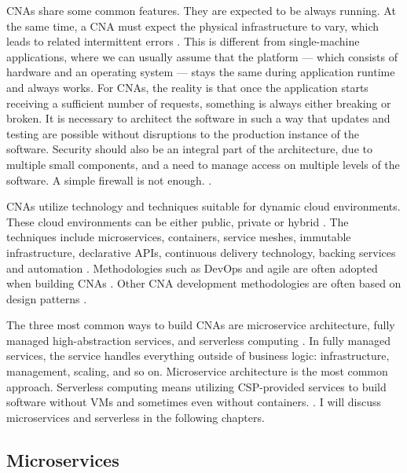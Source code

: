 \documentclass[utf8,english]{gradu3}
\begin{document}
CNAs share some common features. They are expected to be always running. At the
same time, a CNA must expect the physical infrastructure to vary, which leads to
related intermittent errors \parencite[17]{Gannon2017}. This is different from
single-machine applications, where we can usually assume that the platform —
which consists of hardware and an operating system --- stays the same during
application runtime and always works. For CNAs, the reality is that once the
application starts receiving a sufficient number of requests, something is
always either breaking or broken. It is necessary to architect the software in
such a way that updates and testing are possible without disruptions to the
production instance of the software. Security should also be an integral part of
the architecture, due to multiple small components, and a need to manage access
on multiple levels of the software. A simple firewall is not enough.
\parencite[17]{Gannon2017}.

CNAs utilize technology and techniques suitable for dynamic cloud environments.
These cloud environments can be either public, private or hybrid
\parencite{CNAF2018}. The techniques include microservices, containers, service
meshes, immutable infrastructure, declarative APIs, continuous delivery
technology, backing services and automation \parencite{CNAF2018, Patrizio2018,
  Microsoft2022-CNA}. Methodologies such as DevOps and agile are often adopted when
building CNAs \parencite{Patrizio2018}. Other CNA development methodologies are
often based on design patterns \parencite{Kratzke2017}.

The three most common ways to build CNAs are microservice architecture, fully
managed high-abstraction services, and serverless computing
\parencite[17]{Gannon2017}. In fully managed services, the service handles
everything outside of business logic: infrastructure, management, scaling, and
so on. Microservice architecture is the most common approach. Serverless
computing means utilizing CSP-provided services to build software without
VMs and sometimes even without containers.
\parencite[17]{Gannon2017}. I will discuss microservices and serverless in the
following chapters.


\subsection{Microservices}
\end{document}
